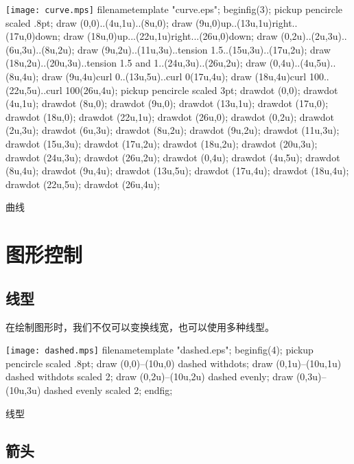 \begin{example}[h]
\begin{FBTDemo}[numbers=left]{\texttt{[image: curve.mps]}}
filenametemplate "curve.eps";
beginfig(3);
pickup pencircle scaled .8pt;
draw (0,0)..(4u,1u)..(8u,0);
draw (9u,0){up}..(13u,1u){right}..(17u,0){down};
draw (18u,0){up}...(22u,1u){right}...(26u,0){down};
draw (0,2u)..(2u,3u)..(6u,3u)..(8u,2u);
draw (9u,2u)..(11u,3u)..tension 1.5..(15u,3u)..(17u,2u);
draw (18u,2u)..(20u,3u)..tension 1.5 and 1..(24u,3u)..(26u,2u);
draw (0,4u)..(4u,5u)..(8u,4u);
draw (9u,4u){curl 0}..(13u,5u)..{curl 0}(17u,4u);
draw (18u,4u){curl 100}..(22u,5u)..{curl 100}(26u,4u);
pickup pencircle scaled 3pt;
drawdot (0,0); drawdot (4u,1u); drawdot (8u,0);
drawdot (9u,0); drawdot (13u,1u); drawdot (17u,0);
drawdot (18u,0); drawdot (22u,1u); drawdot (26u,0);
drawdot (0,2u); drawdot (2u,3u); drawdot (6u,3u); drawdot (8u,2u);
drawdot (9u,2u); drawdot (11u,3u); drawdot (15u,3u); drawdot (17u,2u);
drawdot (18u,2u); drawdot (20u,3u); drawdot (24u,3u); drawdot (26u,2u);
drawdot (0,4u); drawdot (4u,5u); drawdot (8u,4u);
drawdot (9u,4u); drawdot (13u,5u); drawdot (17u,4u);
drawdot (18u,4u); drawdot (22u,5u); drawdot (26u,4u);
\end{FBTDemo}
\caption{\MP 曲线}
\label{exa:mp_curve}
\end{example}

\section{图形控制}
\subsection{线型}

在绘制图形时，我们不仅可以变换线宽，也可以使用多种线型。

\begin{example}[h]
\begin{FBTDemo}[numbers=left]{\texttt{[image: dashed.mps]}}
filenametemplate "dashed.eps";
beginfig(4);
pickup pencircle scaled .8pt;
draw (0,0)--(10u,0) dashed withdots;
draw (0,1u)--(10u,1u) dashed withdots scaled 2;
draw (0,2u)--(10u,2u) dashed evenly;
draw (0,3u)--(10u,3u) dashed evenly scaled 2;
endfig;
\end{FBTDemo}
\caption{\MP 线型}
\label{exa:mp_dashed}
\end{example}

\subsection{箭头}

